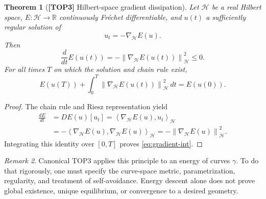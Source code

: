 \documentclass[11pt,letterpaper]{article}
\newtheorem{theorem}{Theorem}[section]
\theoremstyle{definition}
\theoremstyle{remark}
\newtheorem{remark}[theorem]{Remark}
\newcommand{\R}{\mathbb R}
\newcommand{\norm}[1]{\left\lVert#1\right\rVert}
\newcommand{\inner}[2]{\left\langle#1,#2\right\rangle}
\newcommand{\id}[1]{\textnormal{\textbf{[#1]}}}
\begin{document}
\begin{theorem}[\id{TOP3} Hilbert-space gradient dissipation]\label{thm:gradient}
Let $\mathcal H$ be a real Hilbert space, $E:\mathcal H\to\R$
continuously Fr\'echet differentiable, and $u(t)$ a sufficiently
regular solution of
\begin{equation*}
u_t=-\nabla_{\mathcal H}E(u).
\end{equation*}
Then
\begin{equation}\label{eq:gradient}
\boxed{\frac{d}{dt}E(u(t))
=-\norm{\nabla_{\mathcal H}E(u(t))}_{\mathcal H}^2\le0}.
\end{equation}
For all times $T$ on which the solution and chain rule exist,
\begin{equation}\label{eq:gradient-int}
E(u(T))+\int_0^T\norm{\nabla_{\mathcal H}E(u(t))}_{\mathcal H}^2\,dt=E(u(0)).
\end{equation}
\end{theorem}
\begin{proof}
The chain rule and Riesz representation yield
\begin{align*}
\frac{dE}{dt}&=DE(u)[u_t]
=\inner{\nabla_{\mathcal H}E(u)}{u_t}_{\mathcal H}\\
&=-\inner{\nabla_{\mathcal H}E(u)}{\nabla_{\mathcal H}E(u)}_{\mathcal H}
=-\norm{\nabla_{\mathcal H}E(u)}_{\mathcal H}^2.
\end{align*}
Integrating this identity over $[0,T]$ proves
\eqref{eq:gradient-int}.
\end{proof}
\begin{remark}
Canonical TOP3 applies this principle to an energy of curves $\gamma$.
To do that rigorously, one must specify the curve-space metric,
parametrization, regularity, and treatment of self-avoidance.
Energy descent alone does not prove global existence, unique equilibrium,
or convergence to a desired geometry.
\end{remark}
\end{document}
